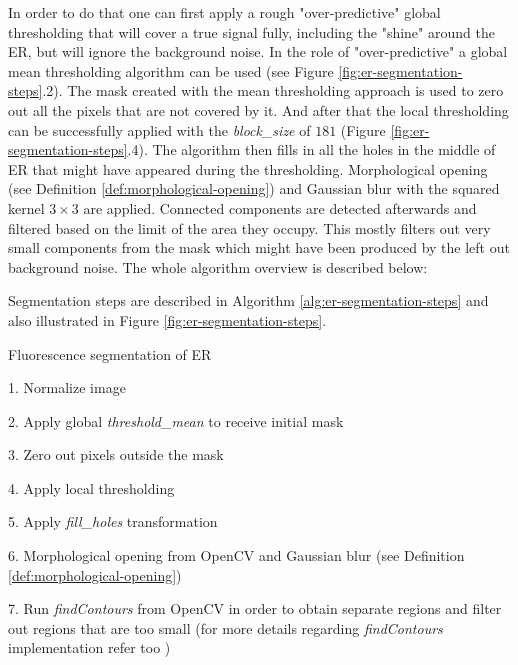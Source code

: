 In order to do that one can first apply a rough "over-predictive" global thresholding that will cover a true signal fully, including the "shine" around the ER, but will ignore the background noise. In the role of "over-predictive" a global mean thresholding algorithm can be used (see Figure \ref{fig:er-segmentation-steps}.2). The mask created with the mean thresholding approach is used to zero out all the pixels that are not covered by it. And after that the local thresholding can be successfully applied with the \textit{block\_size} of $181$ (Figure \ref{fig:er-segmentation-steps}.4). The algorithm then fills in all the holes in the middle of ER that might have appeared during the thresholding. Morphological opening (see Definition \ref{def:morphological-opening}) and Gaussian blur with the squared kernel $3 \times 3$ are applied. Connected components are detected afterwards and filtered based on the limit of the area they occupy. This mostly filters out very small components from the mask which might have been produced by the left out background noise. The whole algorithm overview is described below:

Segmentation steps are described in Algorithm \ref{alg:er-segmentation-steps} and also illustrated in Figure \ref{fig:er-segmentation-steps}.

\begin{algorithm}[htb]
    \caption{Fluorescence segmentation of ER}
    \begin{algorithmic}
    \item 1. Normalize image
    \item 2. Apply global \textit{threshold\_mean} to receive initial mask
    \item 3. Zero out pixels outside the mask
    \item 4. Apply local thresholding
    \item 5. Apply \textit{fill\_holes} transformation
    \item 6. Morphological opening from OpenCV and Gaussian blur (see Definition \ref{def:morphological-opening})
    \item 7. Run \textit{findContours} from OpenCV in order to obtain separate regions and filter out regions that are too small (for more details regarding \textit{findContours} implementation refer too \cite{Suzuki_1985})
    \end{algorithmic}
    \label{alg:er-segmentation-steps}
\end{algorithm}    

